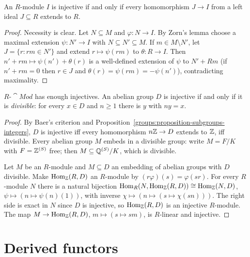 \begin{proposition}\label{homological-algebra:proposition-baer}
An $R$-module $I$ is injective if and only if every homomorphism $J \to I$ from a left ideal $J \subseteq R$ extends to $R$.
\end{proposition}

\begin{proof}
Necessity is clear. Let $N \subseteq M$ and $\varphi \colon N \to I$. By Zorn's lemma choose a maximal extension
$\psi \colon N' \to I$ with $N \subseteq N' \subseteq M$. If $m \in M \setminus N'$, let $J = \{r : rm \in N'\}$ and extend
$r \mapsto \psi(rm)$ to $\theta \colon R \to I$. Then $n' + rm \mapsto \psi(n') + \theta(r)$ is a well-defined extension of $\psi$ to
$N' + Rm$ (if $n' + rm = 0$ then $r \in J$ and $\theta(r) = \psi(rm) = -\psi(n')$), contradicting maximality.
\end{proof}

\begin{theorem}\label{homological-algebra:theorem-enough-injectives}
$R\text{-}\cat{Mod}$ has enough injectives. An abelian group $D$ is injective if and only if it is \emph{divisible}: for every
$x \in D$ and $n \geq 1$ there is $y$ with $ny = x$.
\end{theorem}

\begin{proof}
By Baer's criterion and Proposition~\ref{groups:proposition-subgroups-integers}, $D$ is injective iff every homomorphism
$n\mathbb{Z} \to D$ extends to $\mathbb{Z}$, iff divisible. Every abelian group $M$ embeds in a divisible group: write $M = F/K$ with
$F = \mathbb{Z}^{(S)}$ free; then $M \subseteq \mathbb{Q}^{(S)}/K$, which is divisible.

Let $M$ be an $R$-module and $M \subseteq D$ an embedding of abelian groups with $D$ divisible. Make $\operatorname{Hom}_{\mathbb{Z}}(R, D)$ an
$R$-module by $(r\varphi)(s) = \varphi(sr)$. For every $R$-module $N$ there is a natural bijection
$\operatorname{Hom}_R(N, \operatorname{Hom}_{\mathbb{Z}}(R, D)) \cong \operatorname{Hom}_{\mathbb{Z}}(N, D)$, $\psi \mapsto (n \mapsto \psi(n)(1))$, with inverse
$\chi \mapsto (n \mapsto (s \mapsto \chi(sn)))$. The right side is exact in $N$ since $D$ is injective, so $\operatorname{Hom}_{\mathbb{Z}}(R, D)$ is an
injective $R$-module. The map $M \to \operatorname{Hom}_{\mathbb{Z}}(R, D)$, $m \mapsto (s \mapsto sm)$, is $R$-linear and injective.
\end{proof}

\section{Derived functors}\label{homological-algebra:section-derived-functors}

